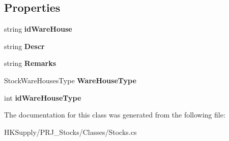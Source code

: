 \subsection*{Properties}
\begin{DoxyCompactItemize}
\item 
\mbox{\label{class_h_k_supply_1_1_p_r_j___stocks_1_1_classes_1_1_stocks_1_1_warehouse_a140137f94ea2cf0715c4e7cf38a29b45}} 
string {\bfseries id\+Ware\+House}
\item 
\mbox{\label{class_h_k_supply_1_1_p_r_j___stocks_1_1_classes_1_1_stocks_1_1_warehouse_abe9a23f94f02fdb91143fe2eb57a8cfd}} 
string {\bfseries Descr}
\item 
\mbox{\label{class_h_k_supply_1_1_p_r_j___stocks_1_1_classes_1_1_stocks_1_1_warehouse_aa79e55bc6ba438b9819d2d0cc192d729}} 
string {\bfseries Remarks}
\item 
\mbox{\label{class_h_k_supply_1_1_p_r_j___stocks_1_1_classes_1_1_stocks_1_1_warehouse_a998d31b378f09094f1833cd768b14a8c}} 
Stock\+Ware\+Houses\+Type {\bfseries Ware\+House\+Type}
\item 
\mbox{\label{class_h_k_supply_1_1_p_r_j___stocks_1_1_classes_1_1_stocks_1_1_warehouse_a82d4be1ef33e3819129cfad30689c146}} 
int {\bfseries id\+Ware\+House\+Type}
\end{DoxyCompactItemize}


The documentation for this class was generated from the following file\+:\begin{DoxyCompactItemize}
\item 
H\+K\+Supply/\+P\+R\+J\+\_\+\+Stocks/\+Classes/Stocks.\+cs\end{DoxyCompactItemize}
